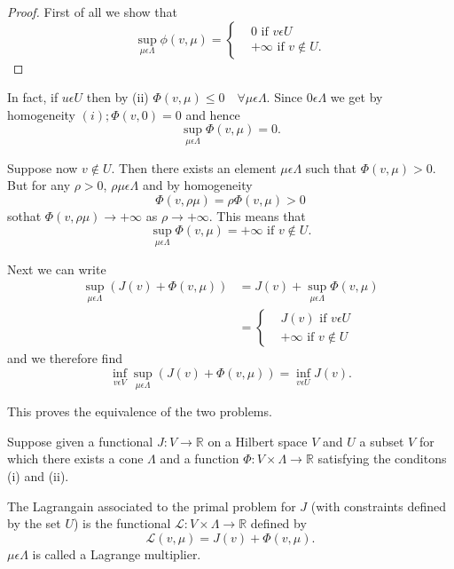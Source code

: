 \begin{proof}
First of all we show that
\begin{equation*}
\sup_{\mu \epsilon \Lambda} \phi (v, \mu) = 
\begin{cases}
& 0 \text{ if } v \epsilon U\\
& +\infty \text{ if } v \notin U.
\end{cases}
\end{equation*}
\end{proof}

In fact, if $u \epsilon U$ then by (ii) $\Phi (v, \mu) \leq 0 \quad \forall \mu \epsilon \Lambda$. Since $0 \epsilon \Lambda$ we get by homogeneity 
$(i) ; \Phi (v, 0) = 0$ and hence
$$
\sup_{\mu \epsilon \Lambda} \Phi (v, \mu) = 0.
$$

Suppose now $v \notin U$. Then there exists an element $\mu \epsilon \Lambda$ such that $\Phi (v, \mu) > 0$. But for any $\rho > 0$, $\rho \mu \epsilon \Lambda$ and by homogeneity
$$
\Phi (v, \rho \mu) = \rho \Phi (v, \mu) > 0
$$
so\pageoriginale that $\Phi (v, \rho \mu) \to + \infty$ as $\rho \to + \infty$. This means that
$$
\sup_{\mu \epsilon \Lambda} \Phi (v, \mu) = + \infty \text{ if } v \notin U.
$$

Next we can write
\begin{align*}
\sup_{\mu \epsilon \Lambda} (J(v) + \Phi(v, \mu)) & = J(v) + \sup_{\mu \epsilon \Lambda} \Phi (v, \mu)\\
& = \begin{cases}
     & J(v) \text{ if } v \epsilon U\\
     & + \infty \text{ if } v \notin U
    \end{cases}
\end{align*}
and we therefore find
$$
\inf_{v \epsilon V} \sup_{\mu \epsilon \Lambda} (J(v) + \Phi (v, \mu)) = \inf_{v \epsilon U} J(v).
$$

This proves the equivalence of the two problems.

Suppose given a functional $J : V \to \mathbb{R}$ on a Hilbert space $V$ and $U$ a subset $V$ for which there exists a cone $\Lambda$ and a function $\Phi : V \times \Lambda \to \mathbb{R}$ satisfying the conditons (i) and (ii).

\begin{definition}\label{chap5-defi1.1}
The Lagrangain associated to the primal problem for $J$ (with constraints defined by the set $U$) is the functional $\mathscr{L} : V \times \Lambda \to \mathbb{R}$ defined by
\begin{equation*}
\mathscr{L} (v, \mu) = J(v) + \Phi(v, \mu).\tag{1.4}\label{chap5-eq1.4}
\end{equation*}
$\mu \epsilon \Lambda$ is called a Lagrange multiplier.
\end{definition}

